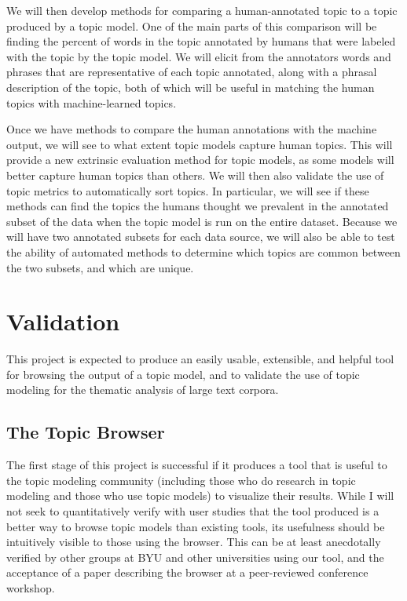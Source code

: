 \documentclass[ms]{byuprop}
\begin{document}
We will then develop methods for comparing a human-annotated topic to a topic
produced by a topic model.  One of the main parts of this comparison will be
finding the percent of words in the topic annotated by humans that were labeled
with the topic by the topic model.  We will elicit from the annotators words
and phrases that are representative of each topic annotated, along with a
phrasal description of the topic, both of which will be useful in matching the
human topics with machine-learned topics.

Once we have methods to compare the human annotations with the machine output,
we will see to what extent topic models capture human topics.  This will
provide a new extrinsic evaluation method for topic models, as some models will
better capture human topics than others.  We will then also validate the use of
topic metrics to automatically sort topics.  In particular, we will see if
these methods can find the topics the humans thought we prevalent in the
annotated subset of the data when the topic model is run on the entire dataset.
Because we will have two annotated subsets for each data source, we will also
be able to test the ability of automated methods to determine which topics are
common between the two subsets, and which are unique.


\section{Validation}

This project is expected to produce an easily usable, extensible, and helpful
tool for browsing the output of a topic model, and to validate the use of topic
modeling for the thematic analysis of large text corpora.

\subsection{The Topic Browser}

The first stage of this project is successful if it produces a tool that is
useful to the topic modeling community (including those who do research in
topic modeling and those who use topic models) to visualize their results.
While I will not seek to quantitatively verify with user studies that the tool
produced is a better way to browse topic models than existing tools, its
usefulness should be intuitively visible to those using the browser.  This can
be at least anecdotally verified by other groups at BYU and other universities
using our tool, and the acceptance of a paper describing the browser at a
peer-reviewed conference workshop.
\end{document}
